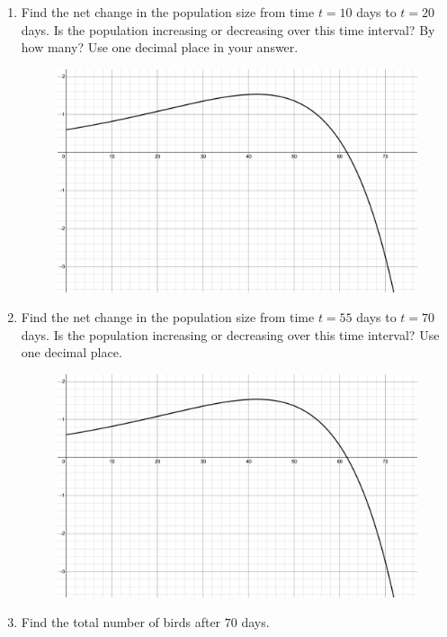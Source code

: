 \begin{example}
\begin{enumerate}[leftmargin=*]
\item Find the net change in the population size from time $t=10$ days to $t=20$ days.  Is the population increasing or decreasing over this time interval? By how many? Use one decimal place in your answer.
\begin{figure}[h!]
        \flushleft
        \includegraphics[scale=0.20]{images/netChange/birdPopulation1.png}
    \end{figure}
\newpage
\item Find the net change in the population size from time $t=55$ days to $t=70$ days.  Is the population increasing or decreasing over this time interval?  Use one decimal place. 
\begin{figure}[h!]
        \flushleft
        \includegraphics[scale=0.20]{images/netChange/birdPopulation1.png}
    \end{figure}
\item Find the total number of birds after $70$ days.

\end{enumerate}
\end{example}
